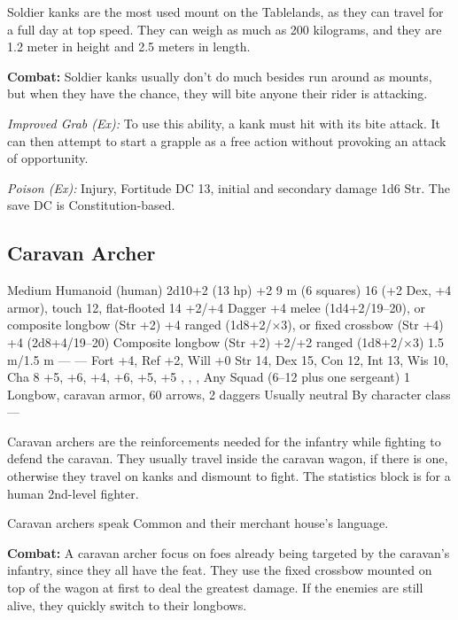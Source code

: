 Soldier kanks are the most used mount on the Tablelands, as they can travel for a full day at top speed. They can weigh as much as 200 kilograms, and they are 1.2 meter in height and 2.5 meters in length.

\textbf{Combat:} Soldier kanks usually don't do much besides run around as mounts, but when they have the chance, they will bite anyone their rider is attacking.

\textit{Improved Grab (Ex):} To use this ability, a kank must hit with its bite attack. It can then attempt to start a grapple as a free action without provoking an attack of opportunity.

\textit{Poison (Ex):} Injury, Fortitude DC 13, initial and secondary damage 1d6 Str. The save DC is Constitution-based.


\subsection{Caravan Archer}
\begin{MonsterStats}
{Medium Humanoid (human)}
{2d10+2 (13 hp)}
{+2}
{9 m (6 squares)}
{16 (+2 Dex, +4 armor), touch 12, flat-flooted 14}
{+2/+4}
{Dagger +4 melee (1d4+2/19--20), or composite longbow (Str +2) +4 ranged (1d8+2/$\times$3), or fixed crossbow (Str +4) +4 (2d8+4/19--20)}
{Composite longbow (Str +2) +2/+2 ranged (1d8+2/$\times$3)}
{1.5 m/1.5 m}
{---}
{---}
{Fort +4, Ref +2, Will +0}
{Str 14, Dex 15, Con 12, Int 13, Wis 10, Cha 8}
{
	 +5,
	 +6,
	 +4,
	 +6,
	 +5,
	 +5
}
{
	,
	,
	,
}
{Any}
{Squad (6--12 plus one sergeant)}
{1}
{Longbow, caravan armor, 60 arrows, 2 daggers}
{Usually neutral}
{By character class}
{---}
\end{MonsterStats}

Caravan archers are the reinforcements needed for the infantry while fighting to defend the caravan. They usually travel inside the caravan wagon, if there is one, otherwise they travel on kanks and dismount to fight. The statistics block is for a human 2nd-level fighter.

Caravan archers speak Common and their merchant house's language.

\textbf{Combat:} A caravan archer focus on foes already being targeted by the caravan's infantry, since they all have the  feat. They use the fixed crossbow mounted on top of the wagon at first to deal the greatest damage. If the enemies are still alive, they quickly switch to their longbows.

